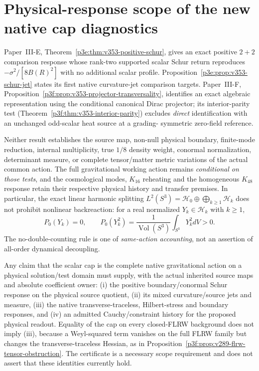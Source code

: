 \documentclass[12pt,a4paper]{article}
\begin{document}
\section{Physical-response scope of the new native cap diagnostics}
\label{p6a:sec:v353-native-cap-scope}
Paper~III-E, Theorem~\ref{p3e:thm:v353-positive-schur}, gives an exact
positive $2+2$ comparison response whose rank-two supported scalar
Schur return reproduces $-\sigma^2/[8B(R)^2]$ with no additional scalar
profile.  Proposition~\ref{p3e:prop:v353-schur-jet} states its first
native curvature-jet comparison targets.
Paper~III-F, Proposition~\ref{p3f:prop:v353-projector-transversality},
identifies an exact algebraic representation using the conditional
canonical Dirac projector; its interior-parity test
(Theorem~\ref{p3f:thm:v353-interior-parity}) excludes \emph{direct}
identification with an unchanged odd-scalar heat source at a grading-
symmetric zero-field reference.

Neither result establishes the source map, non-null physical boundary,
finite-mode reduction, internal multiplicity, true $1/8$ density weight,
conormal normalization, determinant measure, or complete tensor/matter
metric variations of the actual common action.  The full gravitational
working action remains \emph{conditional on those tests}, and the
cosmological modes, $K_{16}$ reheating and the homogeneous $K_{48}$
response retain their respective physical history and transfer
premises.  In particular, the exact linear harmonic splitting
$L^2(S^3)=\mathcal H_0\oplus\bigoplus_{k\ge1}\mathcal H_k$
does not prohibit nonlinear backreaction:
for a real normalized $Y_k\in\mathcal H_k$ with $k\ge1$,
\[
 P_0(Y_k)=0,\qquad
 P_0(Y_k^2)=\frac{1}{\operatorname{Vol}(S^3)}\int_{S^3}Y_k^2dV>0.
\]
The no-double-counting rule is one of \emph{same-action accounting},
not an assertion of all-order dynamical decoupling.

\begin{proposition}
\label{p6a:prop:v353-gravitational-certificate}
Any claim that the scalar cap is the complete native gravitational
action on a physical solution/test domain must supply, with the
actual inherited source maps and absolute coefficient owner:
(i) the positive boundary/conormal Schur response on the physical
source quotient, (ii) its mixed curvature/source jets and measure,
(iii) the native transverse-traceless, Hilbert-stress and boundary
responses, and (iv) an admitted Cauchy/constraint history for the
proposed physical readout.  Equality of the cap on every closed-FLRW
background does not imply (iii), because a Weyl-squared term vanishes
on the full FLRW family but changes the transverse-traceless Hessian,
as in Proposition~\ref{p3f:prop:v289-flrw-tensor-obstruction}.
The certificate is a necessary scope requirement and does not assert
that these identities currently hold.
\end{proposition}
\end{document}
